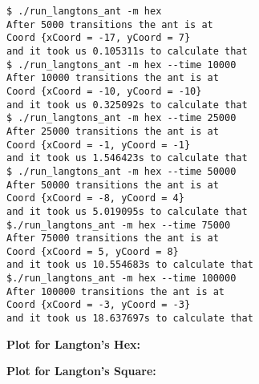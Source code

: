 \documentclass[12pt]{article}
\begin{document}
\begin{lstlisting}
$ ./run_langtons_ant -m hex
After 5000 transitions the ant is at
Coord {xCoord = -17, yCoord = 7}
and it took us 0.105311s to calculate that
$ ./run_langtons_ant -m hex --time 10000
After 10000 transitions the ant is at
Coord {xCoord = -10, yCoord = -10}
and it took us 0.325092s to calculate that
$ ./run_langtons_ant -m hex --time 25000
After 25000 transitions the ant is at
Coord {xCoord = -1, yCoord = -1}
and it took us 1.546423s to calculate that
$ ./run_langtons_ant -m hex --time 50000
After 50000 transitions the ant is at
Coord {xCoord = -8, yCoord = 4}
and it took us 5.019095s to calculate that
$./run_langtons_ant -m hex --time 75000
After 75000 transitions the ant is at
Coord {xCoord = 5, yCoord = 8}
and it took us 10.554683s to calculate that
$./run_langtons_ant -m hex --time 100000
After 100000 transitions the ant is at
Coord {xCoord = -3, yCoord = -3}
and it took us 18.637697s to calculate that
\end{lstlisting}

\break

\large{\textbf{Plot for Langton's Hex: }}

\hfil


\large{\textbf{Plot for Langton's Square: }}

\hfil

\end{document}

